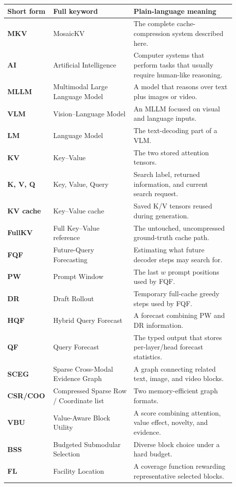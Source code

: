 \documentclass[11pt]{article}
\begin{document}
\begin{longtable}{>{\bfseries}p{0.15\linewidth}p{0.34\linewidth}p{0.43\linewidth}}
\toprule
Short form & Full keyword & Plain-language meaning \\
\midrule
\endhead
MKV & MosaicKV & The complete cache-compression system described here. \\
AI & Artificial Intelligence & Computer systems that perform tasks that usually require human-like reasoning. \\
MLLM & Multimodal Large Language Model & A model that reasons over text plus images or video. \\
VLM & Vision--Language Model & An MLLM focused on visual and language inputs. \\
LM & Language Model & The text-decoding part of a VLM. \\
KV & Key--Value & The two stored attention tensors. \\
K, V, Q & Key, Value, Query & Search label, returned information, and current search request. \\
KV cache & Key--Value cache & Saved K/V tensors reused during generation. \\
FullKV & Full Key--Value reference & The untouched, uncompressed ground-truth cache path. \\
FQF & Future-Query Forecasting & Estimating what future decoder steps may search for. \\
PW & Prompt Window & The last $w$ prompt positions used by FQF. \\
DR & Draft Rollout & Temporary full-cache greedy steps used by FQF. \\
HQF & Hybrid Query Forecast & A forecast combining PW and DR information. \\
QF & Query Forecast & The typed output that stores per-layer/head forecast statistics. \\
SCEG & Sparse Cross-Modal Evidence Graph & A graph connecting related text, image, and video blocks. \\
CSR/COO & Compressed Sparse Row / Coordinate list & Two memory-efficient graph formats. \\
VBU & Value-Aware Block Utility & A score combining attention, value effect, novelty, and evidence. \\
BSS & Budgeted Submodular Selection & Diverse block choice under a hard budget. \\
FL & Facility Location & A coverage function rewarding representative selected blocks. \\

\end{longtable}
\end{document}
